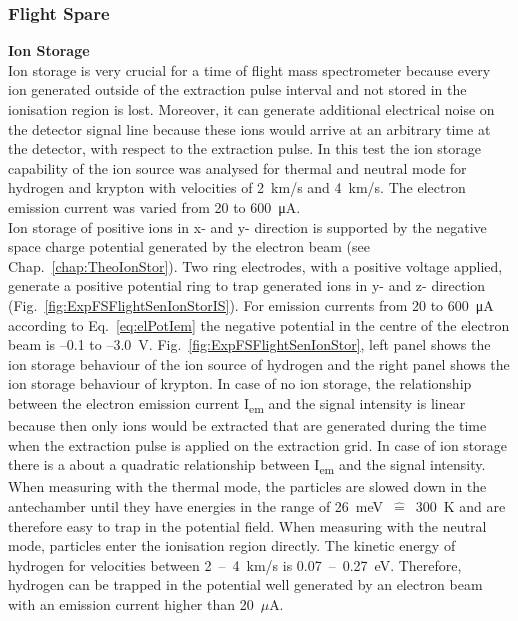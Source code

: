 		\subsubsection{Flight Spare}\label{chap:FSCalib}
		\textbf{Ion Storage}\\
		Ion storage is very crucial for a time of flight mass spectrometer because every ion generated outside of the extraction pulse interval and not stored in the ionisation region is lost. Moreover, it can generate additional electrical noise on the detector signal line because these ions would arrive at an arbitrary time at the detector, with respect to the extraction pulse. In this test the ion storage capability of the ion source was analysed for thermal and neutral mode for hydrogen and krypton with velocities of 2~km/s and 4~km/s. The electron emission current was varied from 20 to 600~\si{\micro\ampere}.\\
		Ion storage of positive ions in x- and y- direction is supported by the negative space charge potential generated by the electron beam (see Chap.~\ref{chap:TheoIonStor}). Two ring electrodes, with a positive voltage applied, generate a positive potential ring to trap generated ions in y- and z- direction (Fig.~\ref{fig:ExpFSFlightSenIonStorIS}). For emission currents from 20 to 600~\si{\micro\ampere} according to Eq.~\eqref{eq:elPotIem} the negative potential in the centre of the electron beam is --0.1 to --3.0~V. Fig.~\ref{fig:ExpFSFlightSenIonStor}, left panel shows the ion storage behaviour of the ion source of hydrogen and the right panel shows the ion storage behaviour of krypton. In case of no ion storage, the relationship between the electron emission current I\textsubscript{em} and the signal intensity is linear because then only ions would be extracted that are generated during the time when the extraction pulse is applied on the extraction grid. In case of ion storage there is a about a quadratic relationship between I\textsubscript{em} and the signal intensity.\\
		When measuring with the thermal mode, the particles are slowed down in the antechamber until they have energies in the range of 26~meV~$\widehat{=}$~300~K and are therefore easy to trap in the potential field. When measuring with the neutral mode, particles enter the ionisation region directly. The kinetic energy of hydrogen for velocities between 2~--~4~km/s is 0.07~--~0.27~eV. Therefore, hydrogen can be trapped in the potential well generated by an electron beam with an emission current higher than 20~$\mu$A.\\
